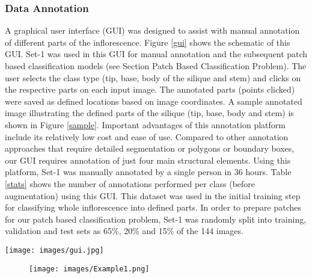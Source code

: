\documentclass[a4paper,num-refs]{oup-contemporary}
\begin{document}
\subsubsection{Data Annotation}
A graphical user interface (GUI) was designed to assist with manual annotation of different parts of the inflorescence. Figure \ref{gui} shows the schematic of this GUI. Set-1 was used in this GUI for manual annotation and the subsequent patch based classification models (see Section  Patch Based Classification Problem). The user selects the class type (tip, base, body of the silique and stem) and clicks on the respective parts on each input image. The annotated parts (points clicked) were saved as defined locations based on image coordinates. A sample annotated image illustrating the defined parts of the silique (tip, base, body and stem) is shown in Figure \ref{sample}. Important advantages of this annotation platform include its relatively low cost and ease of use. Compared to other annotation approaches that require detailed segmentation or polygons or boundary boxes, our GUI requires annotation of just four main structural elements. Using this platform, Set-1 was manually annotated by a single person in 36 hours.  Table \ref{stats} shows the number of annotations performed per class (before augmentation) using this GUI. This dataset was used in the initial training step for classifying whole inflorescence into defined parts. In order to prepare patches for our patch based classification problem, Set-1 was randomly split into training, validation and test sets as 65\%, 20\% and 15\% of the 144 images.  
\begin{figure*}[!ht]
	\centering		\texttt{[image: images/gui.jpg]}
	\caption{Developed GUI used for manually annotating plant parts.}
	\label{gui}
\end{figure*}
\begin{figure*}[!ht]
\centering
\begin{subfigure}[]{1\textwidth}
	\texttt{[image: images/Example1.png]}
\end{subfigure}
	\caption{Example annotated images (from left to right) for tip, base, body and stem.}
	\label{sample}
\end{figure*}
\end{document}
